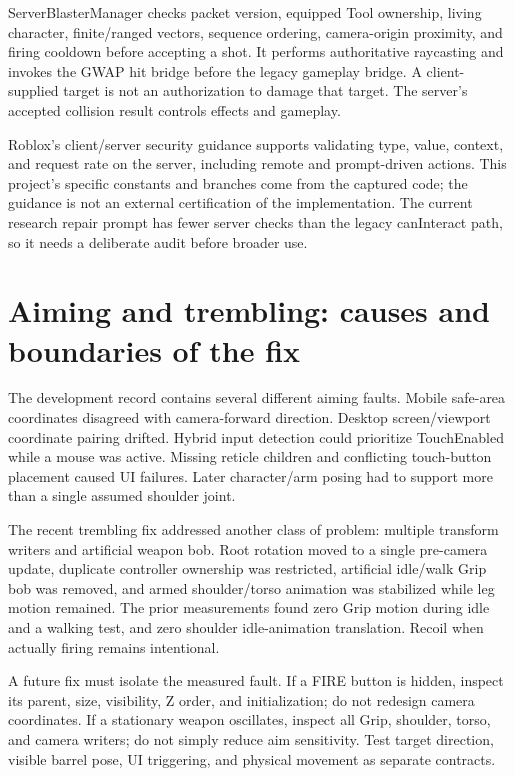 ServerBlasterManager checks packet version, equipped Tool ownership, living character, finite/\allowbreak{}ranged vectors, sequence ordering, camera-origin proximity, and firing cooldown before accepting a shot.\allowbreak{} It performs authoritative raycasting and invokes the GWAP hit bridge before the legacy gameplay bridge.\allowbreak{} A client-supplied target is not an authorization to damage that target.\allowbreak{} The server's accepted collision result controls effects and gameplay.\allowbreak{}

Roblox's client/\allowbreak{}server security guidance supports validating type, value, context, and request rate on the server, including remote and prompt-driven actions.\allowbreak{} This project's specific constants and branches come from the captured code; the guidance is not an external certification of the implementation.\allowbreak{} The current research repair prompt has fewer server checks than the legacy canInteract path, so it needs a deliberate audit before broader use.\allowbreak{}

\section{Aiming and trembling: causes and boundaries of the fix}
The development record contains several different aiming faults.\allowbreak{} Mobile safe-area coordinates disagreed with camera-forward direction.\allowbreak{} Desktop screen/\allowbreak{}viewport coordinate pairing drifted.\allowbreak{} Hybrid input detection could prioritize TouchEnabled while a mouse was active.\allowbreak{} Missing reticle children and conflicting touch-button placement caused UI failures.\allowbreak{} Later character/\allowbreak{}arm posing had to support more than a single assumed shoulder joint.\allowbreak{}

The recent trembling fix addressed another class of problem: multiple transform writers and artificial weapon bob.\allowbreak{} Root rotation moved to a single pre-camera update, duplicate controller ownership was restricted, artificial idle/\allowbreak{}walk Grip bob was removed, and armed shoulder/\allowbreak{}torso animation was stabilized while leg motion remained.\allowbreak{} The prior measurements found zero Grip motion during idle and a walking test, and zero shoulder idle-animation translation.\allowbreak{} Recoil when actually firing remains intentional.\allowbreak{}

A future fix must isolate the measured fault.\allowbreak{} If a FIRE button is hidden, inspect its parent, size, visibility, Z order, and initialization; do not redesign camera coordinates.\allowbreak{} If a stationary weapon oscillates, inspect all Grip, shoulder, torso, and camera writers; do not simply reduce aim sensitivity.\allowbreak{} Test target direction, visible barrel pose, UI triggering, and physical movement as separate contracts.\allowbreak{}

